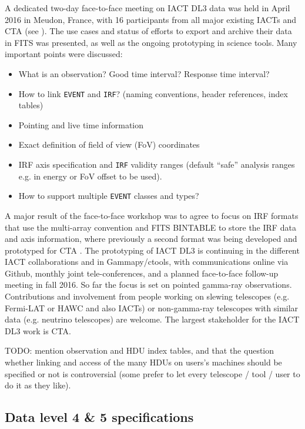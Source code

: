 A dedicated two-day face-to-face meeting on IACT DL3 data was held in April 2016 in Meudon, France, with 16 participants from all major existing IACTs and CTA (see \ogrameudon). The use cases and status of efforts to export and archive their data in FITS was presented, as well as the ongoing prototyping in science tools. Many important points were discussed:

\begin{itemize}
\item{}What is an observation? Good time interval? Response time interval?
\item{}How to link \texttt{EVENT} and \texttt{IRF}? (naming conventions, header references, index tables)
\item{}Pointing and live time information
\item{}Exact definition of field of view (FoV) coordinates
\item{}IRF axis specification and \texttt{IRF} validity ranges (default ``safe'' analysis ranges e.g. in energy or FoV offset to be used).
\item{}How to support multiple \texttt{EVENT} classes and types?
\end{itemize}

A major result of the face-to-face workshop was to agree to focus on IRF formats that use the multi-array convention and FITS BINTABLE to store the IRF data and axis information, where previously a second format was being developed and prototyped for CTA \citep{2015arXiv150807437W}. The prototyping of IACT DL3 is continuing in the different IACT collaborations and in Gammapy/ctools, with communications online via Github, monthly joint tele-conferences, and a planned face-to-face follow-up meeting in fall 2016. So far the focus is set on pointed gamma-ray observations. Contributions and involvement from people working on slewing telescopes (e.g. Fermi-LAT or HAWC and also IACTs) or non-gamma-ray telescopes with similar data (e.g. neutrino telescopes) are welcome. The largest stakeholder for the IACT DL3 work is CTA.

TODO: mention observation and HDU index tables, and that the question whether linking and access of the many HDUs on users's machines should be specified or not is controversial (some prefer to let every telescope / tool / user to do it as they like).

\subsection{Data level 4 \& 5 specifications}

